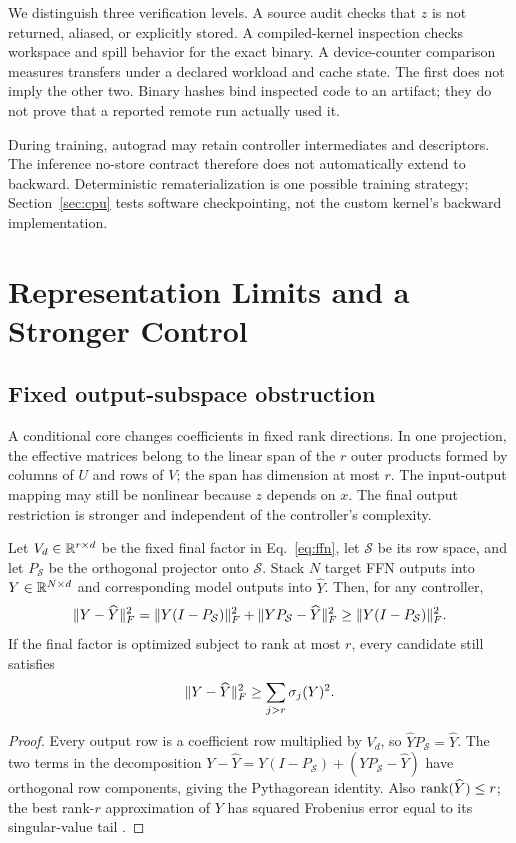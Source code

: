 We distinguish three verification levels. A source audit checks that $z$ is not
returned, aliased, or explicitly stored. A compiled-kernel inspection checks
workspace and spill behavior for the exact binary. A device-counter comparison
measures transfers under a declared workload and cache state. The first does
not imply the other two. Binary hashes bind inspected code to an artifact;
they do not prove that a reported remote run actually used it.

During training, autograd may retain controller intermediates and descriptors.
The inference no-store contract therefore does not automatically extend to
backward. Deterministic rematerialization is one possible training strategy;
Section~\ref{sec:cpu} tests software checkpointing, not the custom kernel's
backward implementation.

\section{Representation Limits and a Stronger Control}
\subsection{Fixed output-subspace obstruction}
A conditional core changes coefficients in fixed rank directions. In one
projection, the effective matrices belong to the linear span of the $r$
outer products formed by columns of $U$ and rows of $V$; the span has dimension
at most $r$. The input-output mapping may still be nonlinear because $z$
depends on $x$. The final output restriction is stronger and independent of
the controller's complexity.

\begin{theorem}\label{thm:subspace}
Let $V_d\in\mathbb{R}^{r\times d}$ be the fixed final factor in Eq.~\eqref{eq:ffn},
let $\mathcal S$ be its row space, and let $P_{\mathcal S}$ be the orthogonal
projector onto $\mathcal S$. Stack $N$ target FFN outputs into $Y\in\mathbb{R}^{N\times d}$
and corresponding model outputs into $\widehat Y$. Then, for any controller,
\begin{equation}
 \lVert Y-\widehat Y\rVert_F^2
 =\lVert Y(I-P_{\mathcal S})\rVert_F^2
  +\lVert YP_{\mathcal S}-\widehat Y\rVert_F^2
 \ge\lVert Y(I-P_{\mathcal S})\rVert_F^2.\label{eq:subspace-floor}
\end{equation}
If the final factor is optimized subject to rank at most $r$, every candidate
still satisfies
\begin{equation}
 \lVert Y-\widehat Y\rVert_F^2\ge\sum_{j>r}\sigma_j(Y)^2.\label{eq:rank-floor}
\end{equation}
\end{theorem}
\begin{proof}
Every output row is a coefficient row multiplied by $V_d$, so
$\widehat YP_{\mathcal S}=\widehat Y$. The two terms in the decomposition
$Y-\widehat Y=Y(I-P_{\mathcal S})+(YP_{\mathcal S}-\widehat Y)$ have orthogonal
row components, giving the Pythagorean identity. Also
$\operatorname{rank}(\widehat Y)\le r$; the best rank-$r$ approximation of $Y$ has squared
Frobenius error equal to its singular-value tail
\citep{eckart1936approximation,mirsky1960norm}.
\end{proof}

